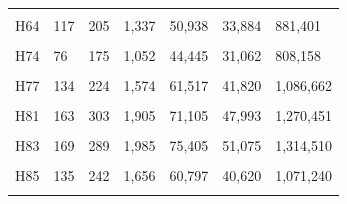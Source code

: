 \documentclass[
  a4paper,
  titlepage]{article}
\begin{document}
\begin{longtable}[t]{lllllll}
\cellcolor{gray!6}{H63} & \cellcolor{gray!6}{146} & \cellcolor{gray!6}{248} & \cellcolor{gray!6}{1,682} & \cellcolor{gray!6}{64,636} & \cellcolor{gray!6}{43,280} & \cellcolor{gray!6}{1,129,081}\\
 
H64 & 117 & 205 & 1,337 & 50,938 & 33,884 & 881,401\\
 
\cellcolor{gray!6}{H70} & \cellcolor{gray!6}{128} & \cellcolor{gray!6}{258} & \cellcolor{gray!6}{1,641} & \cellcolor{gray!6}{64,620} & \cellcolor{gray!6}{43,216} & \cellcolor{gray!6}{1,136,883}\\
 
H74 & 76 & 175 & 1,052 & 44,445 & 31,062 & 808,158\\
 
\cellcolor{gray!6}{H76} & \cellcolor{gray!6}{110} & \cellcolor{gray!6}{227} & \cellcolor{gray!6}{1,403} & \cellcolor{gray!6}{57,547} & \cellcolor{gray!6}{38,705} & \cellcolor{gray!6}{972,647}\\
 
H77 & 134 & 224 & 1,574 & 61,517 & 41,820 & 1,086,662\\
 
\cellcolor{gray!6}{H80} & \cellcolor{gray!6}{97} & \cellcolor{gray!6}{199} & \cellcolor{gray!6}{1,172} & \cellcolor{gray!6}{45,042} & \cellcolor{gray!6}{30,535} & \cellcolor{gray!6}{810,299}\\
 
H81 & 163 & 303 & 1,905 & 71,105 & 47,993 & 1,270,451\\
 
\cellcolor{gray!6}{H82} & \cellcolor{gray!6}{108} & \cellcolor{gray!6}{172} & \cellcolor{gray!6}{1,112} & \cellcolor{gray!6}{44,366} & \cellcolor{gray!6}{30,492} & \cellcolor{gray!6}{813,154}\\
 
H83 & 169 & 289 & 1,985 & 75,405 & 51,075 & 1,314,510\\
 
\cellcolor{gray!6}{H84} & \cellcolor{gray!6}{108} & \cellcolor{gray!6}{172} & \cellcolor{gray!6}{1,176} & \cellcolor{gray!6}{45,737} & \cellcolor{gray!6}{31,919} & \cellcolor{gray!6}{898,549}\\
 
H85 & 135 & 242 & 1,656 & 60,797 & 40,620 & 1,071,240\\
 
\cellcolor{gray!6}{H87} & \cellcolor{gray!6}{130} & \cellcolor{gray!6}{271} & \cellcolor{gray!6}{1,642} & \cellcolor{gray!6}{63,267} & \cellcolor{gray!6}{42,583} & \cellcolor{gray!6}{1,073,153}\\
 

\end{longtable}
\end{document}
